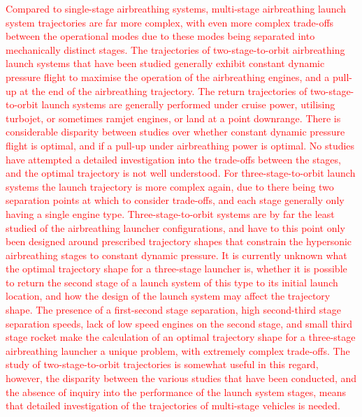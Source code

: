   	   \textcolor{red}{
  	  Compared to single-stage airbreathing systems, multi-stage airbreathing launch system trajectories are far more complex, with even more complex trade-offs between the operational modes due to these modes being separated into mechanically distinct stages\cite{Bulirsch1995}. The trajectories of two-stage-to-orbit airbreathing launch systems that have been studied generally exhibit constant dynamic pressure flight to maximise the operation of the airbreathing engines, and a pull-up at the end of the airbreathing trajectory. The return trajectories of two-stage-to-orbit launch systems are generally performed under cruise power, utilising turbojet, or sometimes ramjet engines\cite{Wilhite1991,Mehta2001,Eklund2012,Bradford2002}, or land at a point downrange\cite{Takahashi1997}. There is considerable disparity between studies over whether constant dynamic pressure flight is optimal, and if a pull-up under airbreathing power is optimal\cite{Wilhite1991,Fujikawa2017,Mehta2001,Takahashi1997,Aberleen,Germain2001,Eklund2012,Bradford2002,Kimura1999,Preller2018a}. No studies have attempted a detailed investigation into the trade-offs between the stages, and the optimal trajectory is not well understood. 
  	   For three-stage-to-orbit launch systems the launch trajectory is more complex again, due to there being two separation points at which to consider trade-offs, and each stage generally only having a single engine type. Three-stage-to-orbit systems are by far the least studied of the airbreathing launcher configurations, and have to this point only been designed around prescribed trajectory shapes that constrain the hypersonic airbreathing stages to constant dynamic pressure\cite{Kimura1999,Preller2018a}. It is currently unknown what the optimal trajectory shape for a three-stage launcher is, whether it is possible to return the second stage of a launch system of this type to its initial launch location, and how the design of the launch system may affect the trajectory shape. The presence of a first-second stage separation, high second-third stage separation speeds, lack of low speed engines on the second stage, and small third stage rocket make the calculation of an optimal trajectory shape for a three-stage airbreathing launcher a unique problem, with extremely complex trade-offs. The study of two-stage-to-orbit trajectories is somewhat useful in this regard, however, the disparity between the various studies that have been conducted, and the absence of inquiry into the performance of the launch system stages, means that detailed investigation of the trajectories of multi-stage vehicles is needed. 
  	}
  	   
